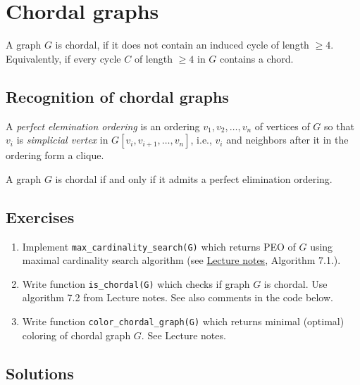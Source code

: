 \chapter{Chordal graphs}

A graph $G$ is chordal, if it does not contain an induced cycle of length $\geq 4$. Equivalently, if every cycle $C$ of length $\geq 4$ in $G$ contains a chord.

\section{Recognition of chordal graphs}


A \emph{perfect elemination ordering} is an ordering $v_1, v_2, \dots, v_n$ of vertices of $G$ so that $v_i$ is \emph{simplicial vertex} in $G[v_{i}, v_{i+1}, \dots, v_n]$, i.e., $v_i$ and neighbors after it in the ordering form a clique.

A graph $G$ is chordal if and only if it admits a perfect elimination ordering.

\section{Exercises}

\begin{enumerate}
\item Implement \verb`max_cardinality_search(G)` which returns PEO of $G$ using maximal cardinality search algorithm (see \href{http://matematika.fri.uni-lj.si/dm/discrete_mathematics.pdf}{Lecture notes}, Algorithm 7.1.).
\item Write function \verb`is_chordal(G)` which checks if graph $G$ is chordal. Use algorithm 7.2 from Lecture notes. See also comments in the code below.
\item Write function \verb`color_chordal_graph(G)` which returns minimal (optimal) coloring of chordal graph $G$. See Lecture notes.
\end{enumerate}

\section{Solutions}

